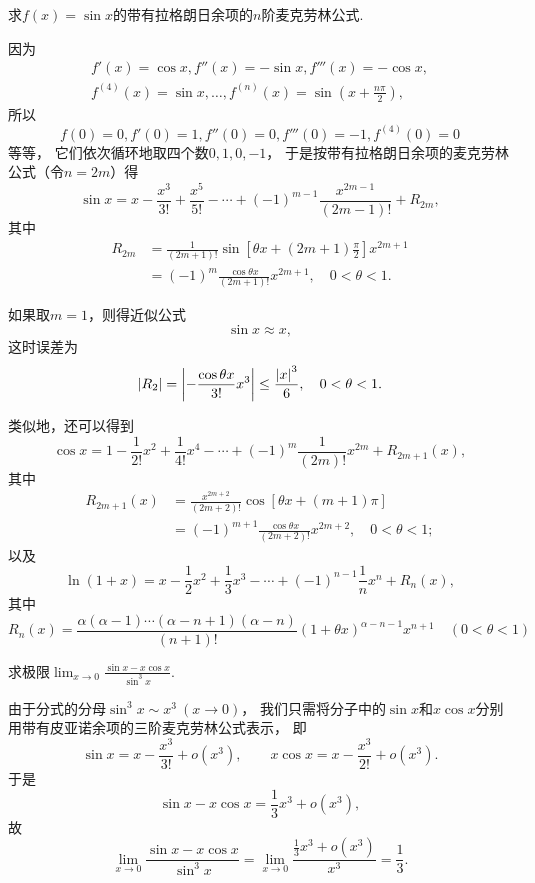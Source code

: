 \begin{example}
求\(f(x)=\sin x\)的带有拉格朗日余项的\(n\)阶麦克劳林公式.
\begin{solution}
因为\begin{align*}
	f'(x)=\cos x,
	f''(x)=-\sin x,
	f'''(x)=-\cos x, \\
	f^{(4)}(x)=\sin x,
	\dotsc,
	f^{(n)}(x)=\sin\left(x+\frac{n\pi}{2}\right),
\end{align*}
所以\[
	f(0)=0,f'(0)=1,f''(0)=0,f'''(0)=-1,f^{(4)}(0)=0
\]等等，
它们依次循环地取四个数\(0,1,0,-1\)，
于是按带有拉格朗日余项的麦克劳林公式（令\(n=2m\)）得\[
	\sin x = x - \frac{x^3}{3!} + \frac{x^5}{5!} - \dotsb + (-1)^{m-1} \frac{x^{2m-1}}{(2m-1)!} + R_{2m},
\]
其中\begin{align*}
	R_{2m}
	&= \frac{1}{(2m+1)!} \sin\left[\theta x + (2m+1)\frac{\pi}{2}\right] x^{2m+1} \\
	&= (-1)^m \frac{\cos \theta x}{(2m+1)!} x^{2m+1},
	\quad 0<\theta<1.
\end{align*}

如果取\(m=1\)，则得近似公式\[
	\sin x \approx x,
\]
这时误差为\[
	\abs{R_2} = \abs{-\frac{\cos \theta x}{3!} x^3}
	\leq \frac{\abs{x}^3}{6},
	\quad 0<\theta<1.
\]
\end{solution}
\end{example}

类似地，还可以得到\[%
	\cos x
	= 1 - \frac{1}{2!} x^2
		+ \frac{1}{4!} x^4 - \dotsb
		+ (-1)^m \frac{1}{(2m)!} x^{2m}
		+ R_{2m+1}(x),
\]
其中\begin{align*}%
	R_{2m+1}(x)
	&= \frac{x^{2m+2}}{(2m+2)!} \cos\left[\theta x + (m+1)\pi\right] \\
	&= (-1)^{m+1} \frac{\cos \theta x}{(2m+2)!} x^{2m+2},
	\quad 0<\theta<1;
\end{align*}
以及\[%
	\ln(1+x)
	= x - \frac{1}{2} x^2 + \frac{1}{3} x^3 - \dotsb
		+ (-1)^{n-1} \frac{1}{n} x^n + R_n(x),
\]
其中\[%
	R_n(x) = \frac{\alpha(\alpha-1)\dotsm(\alpha-n+1)(\alpha-n)}{(n+1)!}
	(1+\theta x)^{\alpha-n-1} x^{n+1}
	\quad(0<\theta<1)
\]

\begin{example}
求极限\(\lim_{x\to0}\frac{\sin x - x \cos x}{\sin^3 x}\).
\begin{solution}
由于分式的分母\(\sin^3 x \sim x^3\ (x\to0)\)，
我们只需将分子中的\(\sin x\)和\(x \cos x\)分别用带有皮亚诺余项的三阶麦克劳林公式表示，
即\[
	\sin x = x - \frac{x^3}{3!} + o(x^3),
	\qquad
	x \cos x = x - \frac{x^3}{2!} + o(x^3).
\]
于是\[
	\sin x - x \cos x = \frac{1}{3} x^3 + o(x^3),
\]
故\[
	\lim_{x\to0}\frac{\sin x - x \cos x}{\sin^3 x}
	= \lim_{x\to0}\frac{\frac{1}{3} x^3 + o(x^3)}{x^3} = \frac{1}{3}.
\]
\end{solution}
\end{example}

